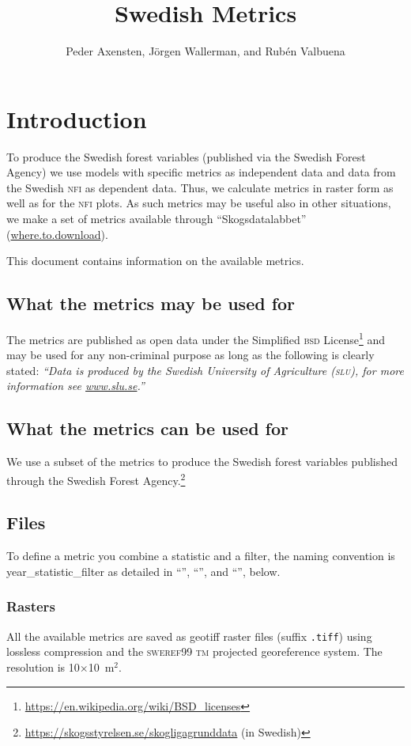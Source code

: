 \documentclass[10pt,english,a4paper
]{article}
\title{Swedish {\lidar} Metrics}
\author{Peder Axensten, Jörgen Wallerman, and Rubén Valbuena}
\newcommand{\download}{“Skogsdatalabbet” (\url{where.to.download})}
\newcommand{\mname}[1]{{\small\texttt{#1}}}
\begin{document}
\maketitle


\section{Introduction}\label{introduction}

To produce the Swedish forest variables (published via the Swedish Forest Agency) we use models with specific metrics as independent data and data from the Swedish \textsc{nfi} as dependent data. Thus, we calculate metrics in raster form as well as for the \textsc{nfi} plots. As such metrics may be useful also in other situations, we make a set of metrics available through {\download}. 

This document contains information on the available metrics. 


\subsection{What the metrics may be used for}

The metrics are published as open data under the Simplified \textsc{bsd} License\footnote{\url{https://en.wikipedia.org/wiki/BSD_licenses}} and may be used for any non-criminal purpose as long as the following is clearly stated:
\emph{“Data is produced by the Swedish University of Agriculture (\textsc{slu}), for more information see \url{www.slu.se}.”}


\subsection{What the metrics can be used for}

We use a subset of the metrics to produce the Swedish forest variables published through the Swedish Forest Agency.\footnote{\url{https://skogsstyrelsen.se/skogligagrunddata} (in Swedish)}


\subsection{Files}

To define a metric you combine a statistic and a filter, the naming convention is year\_statistic\_filter as detailed in “”, “”, and “”, below.

\subsubsection{Rasters}
All the available metrics are saved as geotiff raster files (suffix \mname{.tiff}) using lossless compression and the \textsc{sweref}99 \textsc{tm} projected georeference system. The resolution is 10$\times$10~m$^2$.
\end{document}
